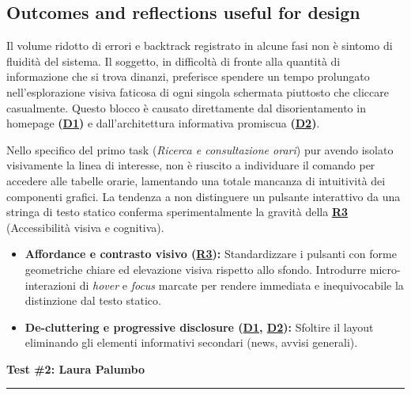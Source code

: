\documentclass[11pt,a4paper]{article}
\begin{document}
\subsection*{Outcomes and reflections useful for design}
\begin{tcolorbox}[colback=backgroundColor,colframe=borderColor,arc=2mm]
Il volume ridotto di errori e backtrack registrato in alcune fasi non è sintomo di fluidità del sistema. Il soggetto, in difficoltà di fronte alla quantità di informazione che si trova dinanzi, preferisce spendere un tempo prolungato nell'esplorazione visiva faticosa di ogni singola schermata piuttosto che cliccare casualmente. Questo blocco è causato direttamente dal disorientamento in homepage \textbf{(\hyperref[iss:D1]{D1})} e dall'architettura informativa promiscua \textbf{(\hyperref[iss:D2]{D2})}.

Nello specifico del primo task (\textit{Ricerca e consultazione orari}) pur avendo isolato visivamente la linea di interesse, non è riuscito a individuare il comando per accedere alle tabelle orarie, lamentando una totale mancanza di intuitività dei componenti grafici.
La tendenza a non distinguere un pulsante interattivo da una stringa di testo statico conferma sperimentalmente la gravità della \textbf{\hyperref[iss:R3]{R3}} (Accessibilità visiva e cognitiva). 

\begin{itemize}[leftmargin=*]
    \item \textbf{Affordance e contrasto visivo (\hyperref[iss:R3]{R3}):} Standardizzare i pulsanti con forme geometriche chiare ed elevazione visiva rispetto allo sfondo. Introdurre micro-interazioni di \textit{hover} e \textit{focus} marcate per rendere immediata e inequivocabile la distinzione dal testo statico.
    \item \textbf{De-cluttering e progressive disclosure (\hyperref[iss:D1]{D1}, \hyperref[iss:D2]{D2}):} Sfoltire il layout eliminando gli elementi informativi secondari (news, avvisi generali).
\end{itemize}
\end{tcolorbox}


\newpage
\begin{center}
  {\color{primaryColor}\large\bfseries Test \#2: Laura Palumbo}\\
  \vspace{0.1cm}
  \color{borderColor}\hrule
\end{center}
\end{document}
